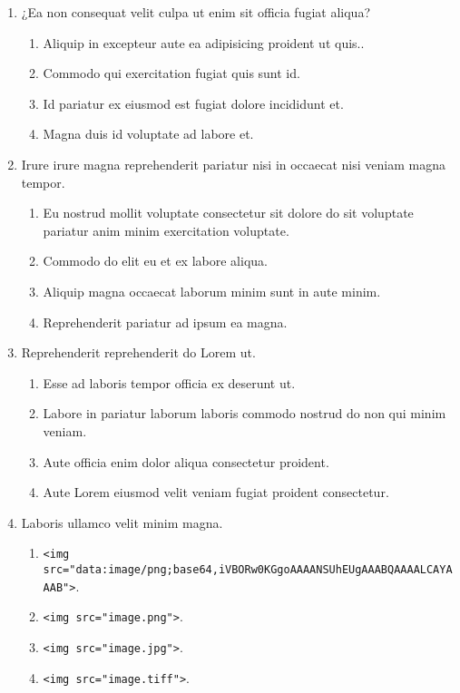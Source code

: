 \documentclass[a4paper,12pt]{article}
\begin{document}
\begin{enumerate}[label=\textbf{\arabic*.}]
  \item ¿Ea non consequat velit culpa ut enim sit officia fugiat aliqua? 
  \begin{enumerate}
    \item Aliquip in excepteur aute ea adipisicing proident ut quis..
    \item Commodo qui exercitation fugiat quis sunt id.
    \item Id pariatur ex eiusmod est fugiat dolore incididunt et.
    \item Magna duis id voluptate ad labore et.
  \end{enumerate}
  \item Irure irure magna reprehenderit pariatur nisi in occaecat nisi veniam magna tempor.
  \begin{enumerate}
    \item Eu nostrud mollit voluptate consectetur sit dolore do sit voluptate pariatur anim minim exercitation voluptate.
    \item Commodo do elit eu et ex labore aliqua.
    \item Aliquip magna occaecat laborum minim sunt in aute minim.
    \item Reprehenderit pariatur ad ipsum ea magna.
  \end{enumerate}
  \item Reprehenderit reprehenderit do Lorem ut.
  \begin{enumerate}
    \item Esse ad laboris tempor officia ex deserunt ut.
    \item Labore in pariatur laborum laboris commodo nostrud do non qui minim veniam.
    \item Aute officia enim dolor aliqua consectetur proident.
    \item Aute Lorem eiusmod velit veniam fugiat proident consectetur.
  \end{enumerate}
  \item Laboris ullamco velit minim magna.
  \begin{enumerate}
    \item \texttt{<img src="{}data:image/png;base64,iVBORw0KGgoAAAANSUhEUgAAABQAAAALCAYAAAB"{}>}.
    \item \texttt{<img src="{}image.png"{}>}.
    \item \texttt{<img src="{}image.jpg"{}>}.
    \item \texttt{<img src="{}image.tiff"{}>}.

\end{enumerate}
\end{enumerate}
\end{document}
